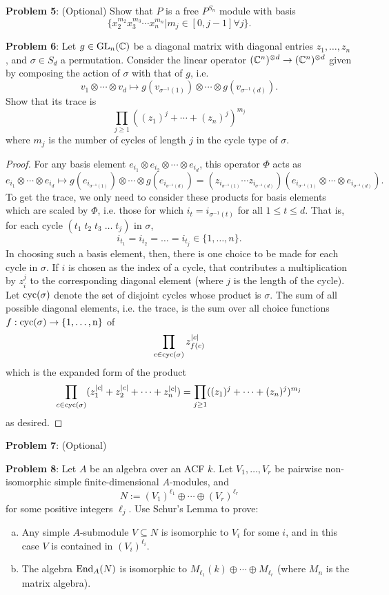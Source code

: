 \documentclass{amsart}
\begin{document}
	\newpage 
	\textbf{Problem 5}: (Optional) Show that $P$ is a free $P^{S_n}$ module with basis 
	$$
	\{x_2^{m_2}x_3^{m_3}\cdots x_n^{m_n} | m_j \in [0,j-1] \forall j\}.
	$$
	
	\newpage 
	\textbf{Problem 6}: Let $g\in \operatorname{GL}_n(\mathbb{C})$ be a diagonal matrix with diagonal entries $z_1,\dots,z_n$, and $\sigma\in S_d$ a permutation. Consider the linear operator $(\mathbb{C}^n)^{\otimes d}\to(\mathbb{C}^n)^{\otimes d}$ given by composing the action of $\sigma$ with that of $g$, i.e.
	$$
	v_1\otimes \cdots \otimes v_d \mapsto g(v_{\sigma^{-1}(1)})\otimes \cdots \otimes g(v_{\sigma^{-1}(d)}).
	$$
	Show that its trace is
	$$
	\prod_{j\geq 1} ((z_1)^j + \cdots + (z_n)^j)^{m_j}
	$$
	where $m_j$ is the number of cycles of length $j$ in the cycle type of $\sigma$.
	\begin{proof}
		For any basis element $e_{i_1}\otimes e_{i_2}\otimes \cdots \otimes e_{i_d}$, this operator $\Phi$ acts as
		$$
		e_{i_1}\otimes \cdots \otimes e_{i_d} \mapsto g(e_{i_{\sigma^{-1}(1)}}) \otimes \cdots \otimes g(e_{i_{\sigma^{-1}(d)}}) = (z_{i_{\sigma^{-1}(1)}}\cdots z_{i_{\sigma^{-1}(d)}}) (e_{i_{\sigma^{-1}(1)}}\otimes \cdots \otimes e_{i_{\sigma^{-1}(d)}}).
		$$
		To get the trace, we only need to consider these products for basis elements which are scaled by $\Phi$, i.e. those for which $i_t = i_{\sigma^{-1}(t)}$ for all $1\leq t \leq d$. That is, for each cycle $(t_1 \; t_2 \; t_3 \; \dots \; t_j)$ in $\sigma$, $$i_{t_1}=i_{t_2}=\dots=i_{t_j} \in \{1,\dots,n\}.$$
		In choosing such a basis element, then, there is one choice to be made for each cycle in $\sigma$. If $i$ is chosen as the index of a cycle, that contributes a multiplication by $z_i^j$ to the corresponding diagonal element (where $j$ is the length of the cycle). Let $\rm{cyc}(\sigma)$ denote the set of disjoint cycles whose product is $\sigma$. The sum of all possible diagonal elements, i.e. the trace, is the sum over all choice functions $f:\rm{cyc}(\sigma)\to \{1,\dots,n\}$ of
		$$
		\prod_{c\in \rm{cyc}(\sigma)} z_{f(c)}^{|c|}
		$$
		which is the expanded form of the product
		$$\prod_{c\in \rm{cyc}(\sigma)} (z_1^{|c|} + z_2^{|c|} + \dots + z_n^{|c|}) =
		\prod_{j\geq 1} ((z_1)^j + \cdots + (z_n)^j)^{m_j}
		$$
		as desired.
	\end{proof}
	
	\newpage 
	\textbf{Problem 7}: (Optional)
	
	\newpage 
	\textbf{Problem 8}: Let $A$ be an algebra over an ACF $k$. Let $V_1,\dots,V_r$ be pairwise non-isomorphic simple finite-dimensional $A$-modules, and 
	$$
	N := (V_1)^{\ell_1}\oplus \cdots \oplus (V_r)^{\ell_r}
	$$ 
	for some positive integers $\ell_j$. Use Schur's Lemma to prove:
	\begin{enumerate}[(a)]
		\item Any simple $A$-submodule $V\subseteq N$ is isomorphic to $V_i$ for some $i$, and in this case $V$ is contained in $(V_i)^{\ell_i}$.
		\item The algebra $\operatorname{End}_A(N)$ is isomorphic to $M_{\ell_1}(k)\oplus \cdots \oplus M_{\ell_r}$ (where $M_n$ is the matrix algebra).
	\end{enumerate}
	
\end{document}
